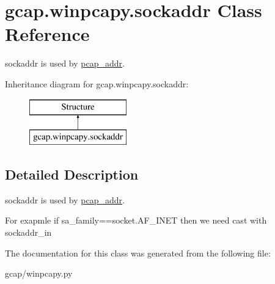\hypertarget{classgcap_1_1winpcapy_1_1sockaddr}{}\section{gcap.\+winpcapy.\+sockaddr Class Reference}
\label{classgcap_1_1winpcapy_1_1sockaddr}


sockaddr is used by \hyperlink{classgcap_1_1winpcapy_1_1pcap__addr}{pcap\+\_\+addr}.  


Inheritance diagram for gcap.\+winpcapy.\+sockaddr\+:\begin{figure}[H]
\begin{center}
\leavevmode
\includegraphics[height=2.000000cm]{d9/d32/classgcap_1_1winpcapy_1_1sockaddr}
\end{center}
\end{figure}


\subsection{Detailed Description}
sockaddr is used by \hyperlink{classgcap_1_1winpcapy_1_1pcap__addr}{pcap\+\_\+addr}. 

For exapmle if sa\+\_\+family==socket.\+A\+F\+\_\+\+I\+N\+ET then we need cast with sockaddr\+\_\+in 

The documentation for this class was generated from the following file\+:\begin{DoxyCompactItemize}
\item 
gcap/winpcapy.\+py\end{DoxyCompactItemize}
